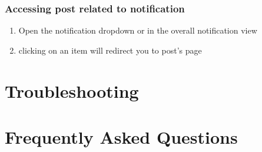 \documentclass[12pt]{article}
\begin{document}
    \subsubsection{Accessing post related to notification}
    \begin{enumerate}
        \item Open the notification dropdown or in the overall notification view
        \item clicking on an item will redirect you to post's page
    \end{enumerate}
    
    
    \section{Troubleshooting}
    
    \section{Frequently Asked Questions}
    
    
\end{document}
